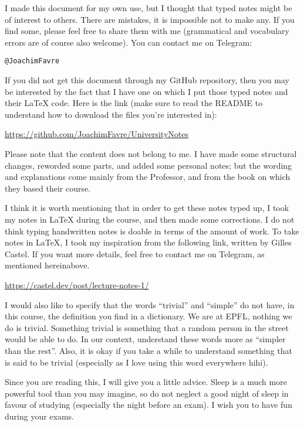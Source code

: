 I made this document for my own use, but I thought that typed notes might be of interest to others. There are mistakes, it is impossible not to make any. If you find some, please feel free to share them with me (grammatical and vocabulary errors are of course also welcome). You can contact me on Telegram:
\begin{center}
    \texttt{@JoachimFavre}
\end{center}

If you did not get this document through my GitHub repository, then you may be interested by the fact that I have one on which I put those typed notes and their \LaTeX{} code. Here is the link (make sure to read the README to understand how to download the files you're interested in):
\begin{center}
    \url{https://github.com/JoachimFavre/UniversityNotes}
\end{center}

Please note that the content does not belong to me. I have made some structural changes, reworded some parts, and added some personal notes; but the wording and explanations come mainly from the Professor, and from the book on which they based their course.

I think it is worth mentioning that in order to get these notes typed up, I took my notes in \LaTeX{} during the course, and then made some corrections. I do not think typing handwritten notes is doable in terms of the amount of work. To take notes in \LaTeX{}, I took my inspiration from the following link, written by Gilles Castel. If you want more details, feel free to contact me on Telegram, as mentioned hereinabove.
\begin{center}
    \url{https://castel.dev/post/lecture-notes-1/}
\end{center}

I would also like to specify that the words ``trivial'' and ``simple'' do not have, in this course, the definition you find in a dictionary. We are at EPFL, nothing we do is trivial. Something trivial is something that a random person in the street would be able to do. In our context, understand these words more as ``simpler than the rest''. Also, it is okay if you take a while to understand something that is said to be trivial (especially as I love using this word everywhere hihi).

Since you are reading this, I will give you a little advice. Sleep is a much more powerful tool than you may imagine, so do not neglect a good night of sleep in favour of studying (especially the night before an exam). I wish you to have fun during your exams.
